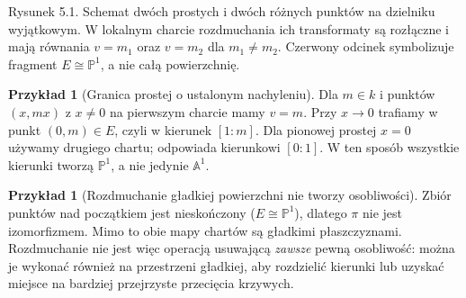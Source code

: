 \documentclass[11pt,a4paper,openany]{report}
\numberwithin{equation}{section}
\theoremstyle{plain}
\theoremstyle{definition}
\newtheorem{przyklad}[twierdzenie]{Przykład}
\theoremstyle{remark}
\newcommand{\A}{\mathbb A}
\newcommand{\PP}{\mathbb P}
\begin{document}
\begin{center}

{\small Rysunek 5.1. Schemat dwóch prostych i dwóch różnych punktów na dzielniku wyjątkowym. W lokalnym charcie rozdmuchania ich transformaty są rozłączne i mają równania $v=m_1$ oraz $v=m_2$ dla $m_1\ne m_2$. Czerwony odcinek symbolizuje fragment $E\cong\PP^1$, a nie całą powierzchnię.}\par
\end{center}

\begin{przyklad}[Granica prostej o ustalonym nachyleniu]
Dla $m\in k$ i punktów $(x,mx)$ z $x\ne0$ na
pierwszym charcie mamy $v=m$. Przy $x\to0$ trafiamy
w punkt $(0,m)\in E$, czyli w kierunek $[1:m]$.
Dla pionowej prostej $x=0$ używamy drugiego chartu;
odpowiada kierunkowi $[0:1]$. W ten sposób wszystkie
kierunki tworzą $\PP^1$, a nie jedynie $\A^1$.
\end{przyklad}

\begin{przyklad}[Rozdmuchanie gładkiej powierzchni nie tworzy osobliwości]
Zbiór punktów nad początkiem jest nieskończony
($E\cong\PP^1$), dlatego $\pi$ nie jest
izomorfizmem. Mimo to obie mapy chartów są
gładkimi płaszczyznami. Rozdmuchanie nie jest więc
operacją usuwającą \emph{zawsze} pewną osobliwość:
można je wykonać również na przestrzeni gładkiej,
aby rozdzielić kierunki lub uzyskać miejsce na
bardziej przejrzyste przecięcia krzywych.
\end{przyklad}
\end{document}
